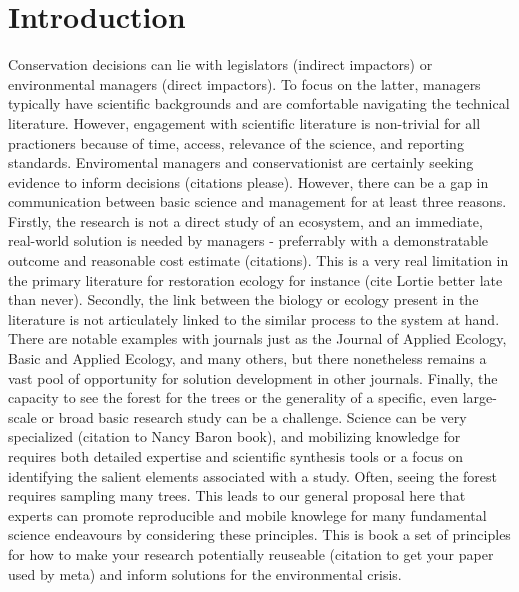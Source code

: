 \documentclass[10pt,letterpaper]{article}
\begin{document}
\linenumbers

\section{Introduction}\label{introduction}

Conservation decisions can lie with legislators (indirect impactors) or
environmental managers (direct impactors). To focus on the latter,
managers typically have scientific backgrounds and are comfortable
navigating the technical literature. However, engagement with scientific
literature is non-trivial for all practioners because of time, access,
relevance of the science, and reporting standards. Enviromental managers
and conservationist are certainly seeking evidence to inform decisions
(citations please). However, there can be a gap in communication between
basic science and management for at least three reasons. Firstly, the
research is not a direct study of an ecosystem, and an immediate,
real-world solution is needed by managers - preferrably with a
demonstratable outcome and reasonable cost estimate (citations). This is
a very real limitation in the primary literature for restoration ecology
for instance (cite Lortie better late than never). Secondly, the link
between the biology or ecology present in the literature is not
articulately linked to the similar process to the system at hand. There
are notable examples with journals just as the Journal of Applied
Ecology, Basic and Applied Ecology, and many others, but there
nonetheless remains a vast pool of opportunity for solution development
in other journals. Finally, the capacity to see the forest for the trees
or the generality of a specific, even large-scale or broad basic
research study can be a challenge. Science can be very specialized
(citation to Nancy Baron book), and mobilizing knowledge for requires
both detailed expertise and scientific synthesis tools or a focus on
identifying the salient elements associated with a study. Often, seeing
the forest requires sampling many trees. This leads to our general
proposal here that experts can promote reproducible and mobile knowlege
for many fundamental science endeavours by considering these principles.
This is book a set of principles for how to make your research
potentially reuseable (citation to get your paper used by meta) and
inform solutions for the environmental crisis.
\end{document}
